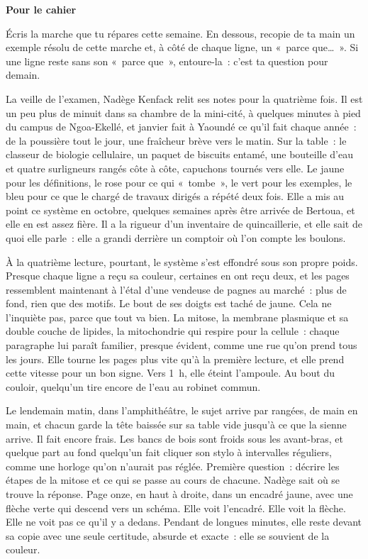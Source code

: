 \documentclass[10.5pt,twoside,openright]{book}
\newenvironment{pourcahier}[1]{\par\vspace{0.9em}\begin{tcolorbox}[colback=black!4,colframe=accent,boxrule=0pt,leftrule=2.2pt,arc=0pt,left=8pt,right=8pt,top=5pt,bottom=5pt]\small\textbf{#1}\par\smallskip}{\end{tcolorbox}\par}
\newcommand{\chapitre}[2]{\cleardoublepage\markright{#2}\thispagestyle{plain}\vspace*{2.2cm}{\noindent\color{accent}\fontsize{54}{54}\selectfont\bfseries #1}\par\vspace{0.5em}{\noindent\LARGE\bfseries #2\par}\vspace{1.6em}\noindent\ignorespaces}
\begin{document}
\begin{pourcahier}{Pour le cahier}
Écris la marche que tu répares cette semaine. En dessous, recopie de ta main un exemple résolu de cette marche et, à côté de chaque ligne, un « parce que… ». Si une ligne reste sans son « parce que », entoure-la : c’est ta question pour demain.
\end{pourcahier}


\chapitre{7}{Fermer le cahier}

La veille de l’examen, Nadège Kenfack relit ses notes pour la quatrième fois. Il est un peu plus de minuit dans sa chambre de la mini-cité, à quelques minutes à pied du campus de Ngoa-Ekellé, et janvier fait à Yaoundé ce qu’il fait chaque année : de la poussière tout le jour, une fraîcheur brève vers le matin. Sur la table : le classeur de biologie cellulaire, un paquet de biscuits entamé, une bouteille d’eau et quatre surligneurs rangés côte à côte, capuchons tournés vers elle. Le jaune pour les définitions, le rose pour ce qui « tombe », le vert pour les exemples, le bleu pour ce que le chargé de travaux dirigés a répété deux fois. Elle a mis au point ce système en octobre, quelques semaines après être arrivée de Bertoua, et elle en est assez fière. Il a la rigueur d’un inventaire de quincaillerie, et elle sait de quoi elle parle : elle a grandi derrière un comptoir où l’on compte les boulons.

À la quatrième lecture, pourtant, le système s’est effondré sous son propre poids. Presque chaque ligne a reçu sa couleur, certaines en ont reçu deux, et les pages ressemblent maintenant à l’étal d’une vendeuse de pagnes au marché : plus de fond, rien que des motifs. Le bout de ses doigts est taché de jaune. Cela ne l’inquiète pas, parce que tout va bien. La mitose, la membrane plasmique et sa double couche de lipides, la mitochondrie qui respire pour la cellule : chaque paragraphe lui paraît familier, presque évident, comme une rue qu’on prend tous les jours. Elle tourne les pages plus vite qu’à la première lecture, et elle prend cette vitesse pour un bon signe. Vers 1 h, elle éteint l’ampoule. Au bout du couloir, quelqu’un tire encore de l’eau au robinet commun.

Le lendemain matin, dans l’amphithéâtre, le sujet arrive par rangées, de main en main, et chacun garde la tête baissée sur sa table vide jusqu’à ce que la sienne arrive. Il fait encore frais. Les bancs de bois sont froids sous les avant-bras, et quelque part au fond quelqu’un fait cliquer son stylo à intervalles réguliers, comme une horloge qu’on n’aurait pas réglée. Première question : décrire les étapes de la mitose et ce qui se passe au cours de chacune. Nadège sait où se trouve la réponse. Page onze, en haut à droite, dans un encadré jaune, avec une flèche verte qui descend vers un schéma. Elle voit l’encadré. Elle voit la flèche. Elle ne voit pas ce qu’il y a dedans. Pendant de longues minutes, elle reste devant sa copie avec une seule certitude, absurde et exacte : elle se souvient de la couleur.
\end{document}
